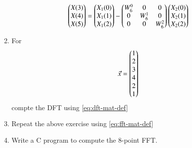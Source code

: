 \documentclass[journal,12pt,twocolumn]{IEEEtran}
\renewcommand\thesection{\arabic{section}}
\begin{document}
\begin{enumerate}[label=\arabic*.,ref=\thesection.\theenumi]
\begin{equation}
{				}
			\end{equation}
			\begin{equation}
				\begin{pmatrix}
					X(3) \\ 
					X(4) \\ 
					X(5) 
				\end{pmatrix}
				=
				\begin{pmatrix}
					X_{1}(0) \\ 
					X_{1}(1)\\ 
					X_{1}(2)
				\end{pmatrix}
				-
				\begin{pmatrix}
					W^{0}_{6} & 0 & 0\\
					0 & W^{1}_{6} & 0\\
					0 & 0 & W^{2}_{6}
				\end{pmatrix}
				\begin{pmatrix}
					X_{2}(0) \\ 
					X_{2}(1) \\ 
					X_{2}(2)
				\end{pmatrix}
				\label{eq:fft-mat-def}
			\end{equation}
			\item For 
			\begin{align}
				\vec{x} = \begin{pmatrix}1\\2\\3\\4\\2\\1\end{pmatrix}
				\label{eq:equation1}
			\end{align}
			compte the DFT using 
			\eqref{eq:dft-mat-def}
			\item Repeat the above exercise using
			\eqref{eq:fft-mat-def}
			\item Write a C program to compute the 8-point FFT. 
		\end{enumerate}
\end{document}
